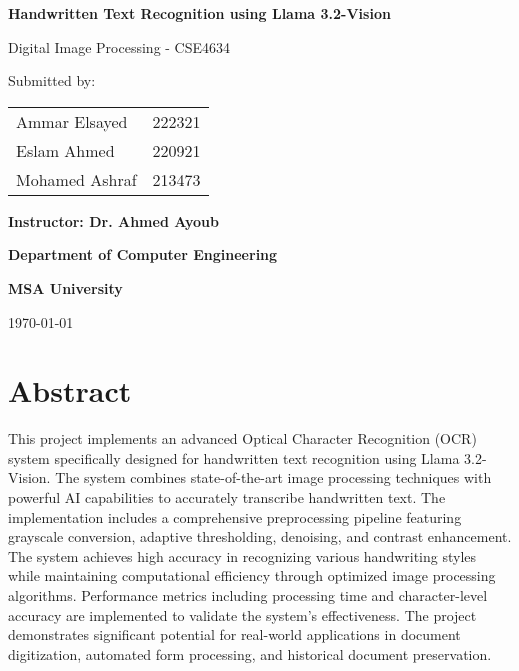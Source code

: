 \documentclass[a4paper,12pt]{article}
\begin{document}
\begin{titlepage}
    \centering
    \vspace{2cm}
    {\Huge \textbf{Handwritten Text Recognition using Llama 3.2-Vision} \par}
    \vspace{1cm}
    {\Large Digital Image Processing - CSE4634 \par}
    \vspace{2cm}
    {\large Submitted by: \par}
    \vspace{0.5cm}
    \begin{tabular}{ll}
        Ammar Elsayed & 222321 \\
        Eslam Ahmed & 220921 \\
        Mohamed Ashraf & 213473 \\
    \end{tabular}
    \vfill
    {\large \textbf{Instructor: Dr. Ahmed Ayoub} \par}
    \vspace{0.5cm}
    {\large \textbf{Department of Computer Engineering} \par}
    {\large \textbf{MSA University} \par}
    \vspace{1cm}
    {\large \today}
\end{titlepage}

\newpage

\section*{Abstract}
This project implements an advanced Optical Character Recognition (OCR) system specifically designed for handwritten text recognition using Llama 3.2-Vision. The system combines state-of-the-art image processing techniques with powerful AI capabilities to accurately transcribe handwritten text. The implementation includes a comprehensive preprocessing pipeline featuring grayscale conversion, adaptive thresholding, denoising, and contrast enhancement. The system achieves high accuracy in recognizing various handwriting styles while maintaining computational efficiency through optimized image processing algorithms. Performance metrics including processing time and character-level accuracy are implemented to validate the system's effectiveness. The project demonstrates significant potential for real-world applications in document digitization, automated form processing, and historical document preservation.
\end{document}
